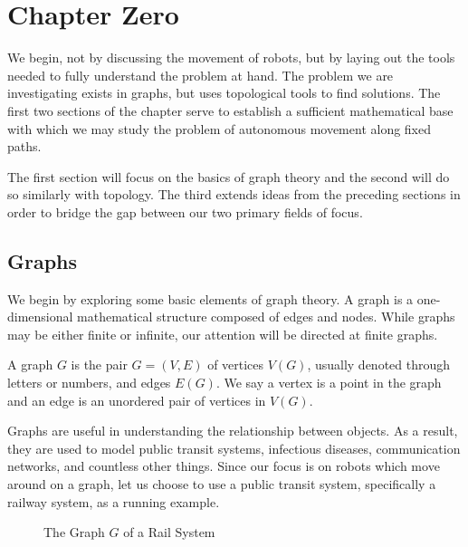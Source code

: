 
\chapter{Chapter Zero}
We begin, not by discussing the movement of robots, but by laying out the tools needed to fully understand the problem at hand. The problem we are investigating exists in graphs, but uses topological tools to find solutions. The first two sections of the chapter serve to establish a sufficient mathematical base with which we may study the problem of autonomous movement along fixed paths.

The first section will focus on the basics of graph theory and the second will do so similarly with topology. The third extends ideas from the preceding sections in order to bridge the gap between our two primary fields of focus.

\section{Graphs}\label{sec:graphs}

We begin by exploring some basic elements of graph theory. A graph is a one-dimensional mathematical structure composed of edges and nodes. While graphs may be either finite or infinite, our attention will be directed at finite graphs.

\begin{defn}
A graph $G$ is the pair $G=(V,E)$ of vertices $V(G)$, usually denoted through letters or numbers, and edges $E(G)$. We say a vertex is a point in the graph and an edge is an unordered pair of vertices in $V(G)$\cite{ed}. 
\end{defn}

Graphs are useful in understanding the relationship between objects. As a result, they are used to model public transit systems, infectious diseases, communication networks, and countless other things. Since our focus is on robots which move around on a graph, let us choose to use a public transit system, specifically a railway system, as a running example.

\begin{figure}[h!]
\caption{The Graph $G$ of a Rail System}\label{fig:railgraph}
\centering
{}
\end{figure}

